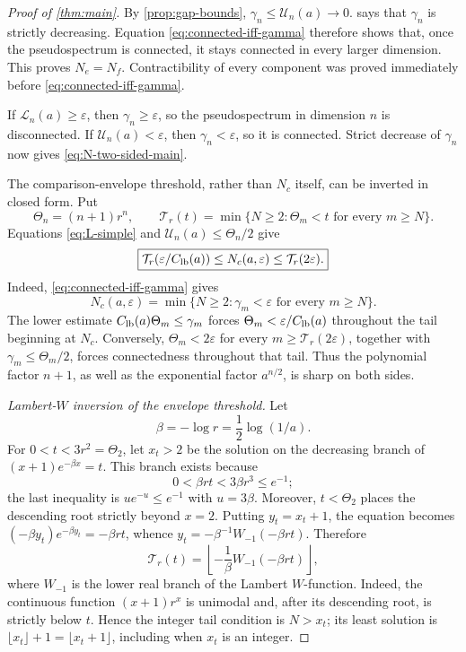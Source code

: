 \documentclass[review,hidelinks,onefignum,onetabnum]{siamart251216}
\begin{document}
\begin{proof}[Proof of \cref{thm:main}]
By \cref{prop:gap-bounds},
\(\gamma_n\leq\mathcal U_n(a)\to0\).   says that
\(\gamma_n\) is strictly decreasing.  Equation
\eqref{eq:connected-iff-gamma} therefore shows that, once the
pseudospectrum is connected, it stays connected in every larger
dimension.  This proves \(N_e=N_f\).  Contractibility of every component
was proved immediately before \eqref{eq:connected-iff-gamma}.

If \(\mathcal L_n(a)\geq\varepsilon\), then
\(\gamma_n\geq\varepsilon\), so the pseudospectrum in dimension \(n\)
is disconnected.  If \(\mathcal U_n(a)<\varepsilon\), then
\(\gamma_n<\varepsilon\), so it is connected.  Strict decrease of
\(\gamma_n\) now gives \eqref{eq:N-two-sided-main}.

The comparison-envelope threshold, rather than \(N_c\) itself, can be
inverted in closed form.
Put
\[
 \Theta_n=(n+1)r^n,\qquad
 \mathcal T_r(t)=\min\{N\geq2:\Theta_m<t\text{ for every }m\geq N\}.
\]
Equations \eqref{eq:L-simple} and
\(\mathcal U_n(a)\leq\Theta_n/2\) give
\begin{equation}\label{eq:tail-threshold-bounds}
 \boxed{
 \mathcal T_r(\varepsilon/C_{\rm lb}(a))\leq N_c(a,\varepsilon)
 \leq\mathcal T_r(2\varepsilon).}
\end{equation}
Indeed, \eqref{eq:connected-iff-gamma} gives
\[
 N_c(a,\varepsilon)=
 \min\{N\geq2:\gamma_m<\varepsilon\text{ for every }m\geq N\}.
\]
The lower estimate \(C_{\rm lb}(a)\Theta_m\leq\gamma_m\) forces
\(\Theta_m<\varepsilon/C_{\rm lb}(a)\) throughout the tail beginning
at \(N_c\).  Conversely, \(\Theta_m<2\varepsilon\) for every
\(m\geq\mathcal T_r(2\varepsilon)\), together with
\(\gamma_m\leq\Theta_m/2\), forces connectedness throughout that tail.
Thus the polynomial factor \(n+1\), as well as the exponential factor
\(a^{n/2}\), is sharp on both sides.

\medskip\noindent\emph{Lambert-\(W\) inversion of the envelope threshold.}\quad
Let
\[
 \beta=-\log r=\frac12\log(1/a).
\]
For \(0<t<3r^2=\Theta_2\), let \(x_t>2\) be the solution on the decreasing
branch of \((x+1)e^{-\beta x}=t\).  This branch exists because
\[
 0<\beta rt<3\beta r^3\leq e^{-1};
\]
the last inequality is \(ue^{-u}\leq e^{-1}\) with \(u=3\beta\).
Moreover, \(t<\Theta_2\) places the descending root strictly beyond
\(x=2\).
Putting \(y_t=x_t+1\), the equation becomes
\((-\beta y_t)e^{-\beta y_t}=-\beta rt\), whence
\(y_t=-\beta^{-1}W_{-1}(-\beta rt)\).  Therefore
\begin{equation}\label{eq:tail-threshold-Lambert}
 \mathcal T_r(t)=\left\lfloor
 -\frac1\beta W_{-1}(-\beta rt)\right\rfloor,
\end{equation}
where \(W_{-1}\) is the lower real branch of the Lambert \(W\)-function.
Indeed, the continuous function \((x+1)r^x\) is unimodal and, after its
descending root, is strictly below \(t\).  Hence the integer tail
condition is \(N>x_t\); its least solution is
\(\lfloor x_t\rfloor+1=\lfloor x_t+1\rfloor\), including when \(x_t\)
is an integer.


\end{proof}
\end{document}
